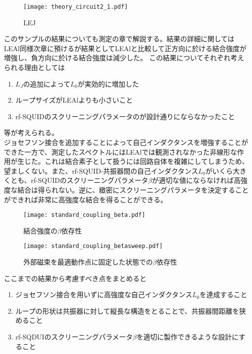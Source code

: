 \begin{figure}[H]
    \centering
    \texttt{[image: theory\_circuit2\_1.pdf]}
    \caption{LEJ}
\end{figure}
このサンプルの結果についても測定の章で解説する。結果の詳細に関してはLEAl同様次章に預けるが結果としてLEAlと比較して正方向に於ける結合強度が増強し、負方向に於ける結合強度は減少した。
この結果についてそれぞれ考えられる理由としては
\begin{enumerate}
    \item $L_J$の追加によって$L_0$が実効的に増加した
    \item ループサイズがLEAlよりも小さいこと
    \item rf-SQUIDのスクリーニングパラメータのが設計通りにならなかったこと
 \end{enumerate}
 等が考えられる。\\
 ジョセフソン接合を追加することによって自己インダクタンスを増強することができた一方で、測定したスペクトルにはLEAlでは観測されなかった非線形な作用が生じた。これは結合素子として扱うには回路自体を複雑にしてしまうため、望ましくない。また、rf-SQUID-共振器間の自己インダクタンス$L_0$がいくら大きくとも、rf-SQUIDのスクリーニングパラメータ$\beta$が適切な値にならなければ高強度な結合は得られない。逆に、緻密にスクリーニングパラメータを決定することができれば非常に高強度な結合を得ることができる。
 \begin{figure}[H]
    \begin{minipage}[t]{0.5\columnwidth}
        \centering
        \texttt{[image: standard\_coupling\_beta.pdf]}
        \caption{結合強度の$\beta$依存性}
    \end{minipage}%
    \begin{minipage}[t]{0.5\columnwidth}
        \centering
        \texttt{[image: standard\_coupling\_betasweep.pdf]}
        \caption{外部磁束を最適動作点に固定した状態での$\beta$依存性}
    \end{minipage}
\end{figure}
 ここまでの結果から考慮すべき点をまとめると
 \begin{enumerate}
    \item ジョセフソン接合を用いずに高強度な自己インダクタンス$L_0$を達成すること
    \item ループの形状は共振器に対して縦長な構造をとることで、共振器間距離を狭めること
    \item rf-SQDUIのスクリーニングパラメータ$\beta$を適切に製作できるような設計にすること
 \end{enumerate}
